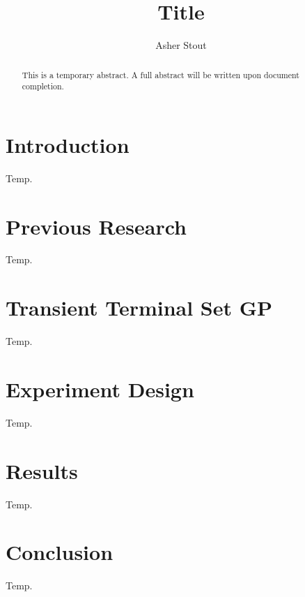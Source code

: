 \documentclass[a4paper]{article}
\title{Title}
\author{Asher Stout}
\begin{document}
\maketitle
\begin{abstract}
	This is a temporary abstract. A full abstract will be written upon document completion.
\end{abstract}

\section{Introduction}
Temp.

\section{Previous Research}
Temp.

\section{Transient Terminal Set GP}
Temp.

\section{Experiment Design}
Temp.

\section{Results}
Temp.

\section{Conclusion}
Temp.

\medskip

\printbibliography
\end{document}
